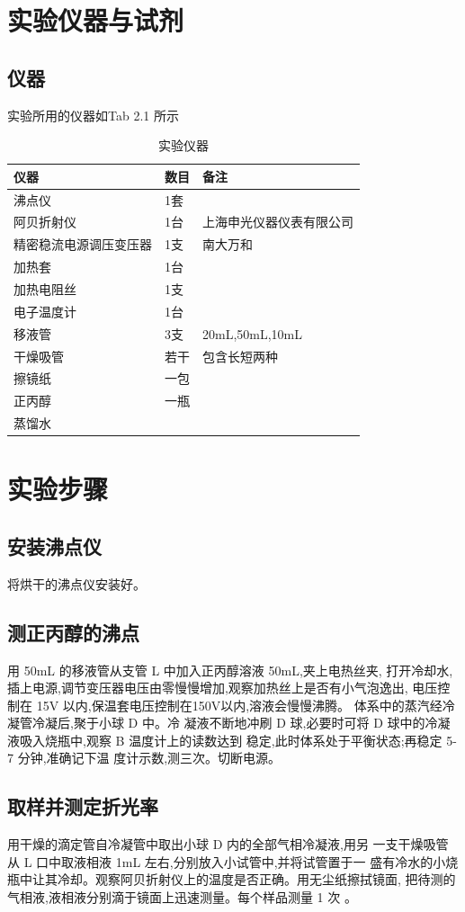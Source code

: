 \documentclass[11pt]{report}
\begin{document}
\chapter{实验仪器与试剂}
\label{sec:orge4581be}
\section{仪器}
\label{sec:org1290668}
实验所用的仪器如Tab 2.1 所示
\begin{table}[htbp]
\caption{\label{tab:org4d7b709}实验仪器}
\centering
\begin{tabular}{lll}
仪器 & 数目 & 备注\\
\hline
沸点仪 & 1套 & \\
阿贝折射仪 & 1台 & 上海申光仪器仪表有限公司\\
精密稳流电源调压变压器 & 1支 & 南大万和\\
加热套 & 1台 & \\
加热电阻丝 & 1支 & \\
电子温度计 & 1台 & \\
移液管 & 3支 & 20mL,50mL,10mL\\
干燥吸管 & 若干 & 包含长短两种\\
擦镜纸 & 一包 & \\
正丙醇 & 一瓶 & \\
蒸馏水 &  & \\
\end{tabular}
\end{table}

\chapter{实验步骤}
\label{sec:org86c2513}
\section{安装沸点仪}
\label{sec:org25df143}
将烘干的沸点仪安装好。
\section{测正丙醇的沸点}
\label{sec:orge97d65e}
     用 50mL 的移液管从支管 L 中加入正丙醇溶液 50mL,夹上电热丝夹,
打开冷却水,插上电源,调节变压器电压由零慢慢增加,观察加热丝上是否有小气泡逸出,
电压控制在 15V 以内,保温套电压控制在150V以内,溶液会慢慢沸腾。
体系中的蒸汽经冷凝管冷凝后,聚于小球 D 中。冷
凝液不断地冲刷 D 球,必要时可将 D 球中的冷凝液吸入烧瓶中,观察 B 温度计上的读数达到
稳定,此时体系处于平衡状态;再稳定 5-7 分钟,准确记下温
度计示数,测三次。切断电源。
\section{取样并测定折光率}
\label{sec:org36001f4}
     用干燥的滴定管自冷凝管中取出小球 D 内的全部气相冷凝液,用另
一支干燥吸管从 L 口中取液相液 1mL 左右,分别放入小试管中,并将试管置于一
盛有冷水的小烧瓶中让其冷却。观察阿贝折射仪上的温度是否正确。用无尘纸擦拭镜面,
把待测的气相液,液相液分别滴于镜面上迅速测量。每个样品测量 1 次 。
\end{document}
